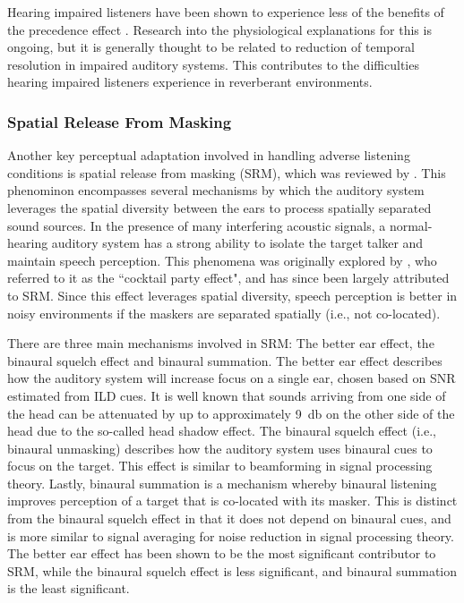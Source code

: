 Hearing impaired listeners have been shown to experience less of the benefits of the precedence effect \citep{roberts2003effects, rennies2022spatio}. Research into the physiological explanations for this is ongoing, but it is generally thought to be related to reduction of temporal resolution in impaired auditory systems. This contributes to the difficulties hearing impaired listeners experience in reverberant environments.  

\subsubsection{Spatial Release From Masking} \label{section_srm}

Another key perceptual adaptation involved in handling adverse listening conditions is spatial release from masking (SRM), which was reviewed by  \cite{litovsky2012spatial}. This phenominon encompasses several mechanisms by which the auditory system leverages the spatial diversity between the ears to process spatially separated sound sources. In the presence of many interfering acoustic signals, a normal-hearing auditory system has a strong ability to isolate the target talker and maintain speech perception. This phenomena was originally explored by \cite{cherry1953some}, who referred to it as the ``cocktail party effect", and has since been largely attributed to SRM. Since this effect leverages spatial diversity, speech perception is better in noisy environments if the maskers are separated spatially (i.e., not co-located). 

There are three main mechanisms involved in SRM: The better ear effect, the binaural squelch effect and binaural summation. The better ear effect describes how the auditory system will increase focus on a single ear, chosen based on SNR estimated from ILD cues. It is well known that sounds arriving from one side of the head can be attenuated by up to approximately \qty{9}{\decibel} on the other side of the head due to the so-called head shadow effect. The binaural squelch effect (i.e., binaural unmasking) describes how the auditory system uses binaural cues to focus on the target. This effect is similar to beamforming in signal processing theory. Lastly, binaural summation is a mechanism whereby binaural listening improves perception of a target that is co-located with its masker. This is distinct from the binaural squelch effect in that it does not depend on binaural cues, and is more similar to signal averaging for noise reduction in signal processing theory. The better ear effect has been shown to be the most significant contributor to SRM, while the binaural squelch effect is less significant, and binaural summation is the least significant.

